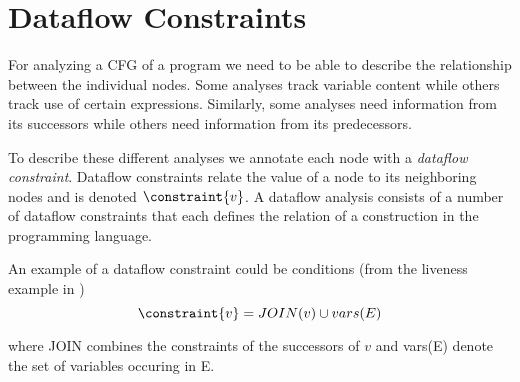 \section{Dataflow Constraints}
For analyzing a CFG of a program we need to be able to describe the relationship between the individual nodes.
Some analyses track variable content while others track use of certain expressions.
Similarly, some analyses need information from its successors while others need information from its predecessors.

To describe these different analyses we annotate each node with a \emph{dataflow constraint}.
Dataflow constraints relate the value of a node to its neighboring nodes and is denoted $\constraint{v}$.
A dataflow analysis consists of a number of dataflow constraints that each defines the relation of a construction in the programming language.

An example of a dataflow constraint could be conditions (from the liveness example in \citet{schwartzbach})
\[ \constraint{v} = JOIN(v) \cup vars(E) \]

where JOIN combines the constraints of the successors of $v$ and vars(E) denote the set of variables occuring in E.
